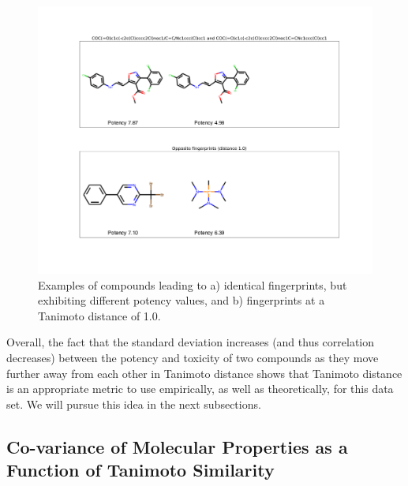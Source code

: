 \documentclass[journal=jacsat,manuscript=article]{achemso}
\begin{document}
\begin{figure}[h!]
\centering
\includegraphics[width=\textwidth]{fig2_same_and_opposite.png}
\caption{Examples of compounds leading to a) identical fingerprints, but exhibiting different potency values, and b) fingerprints at a Tanimoto distance of 1.0. }
\label{fig:examples}
\end{figure}
Overall, the fact that the standard deviation increases (and thus correlation decreases) between the potency and toxicity of two compounds as they move further away from each other in Tanimoto distance shows that Tanimoto distance is an appropriate metric to use empirically, as well as theoretically, for this data set.  We will pursue this idea in the next subsections.  

\subsection*{Co-variance of Molecular Properties as a Function of Tanimoto Similarity}
\end{document}
